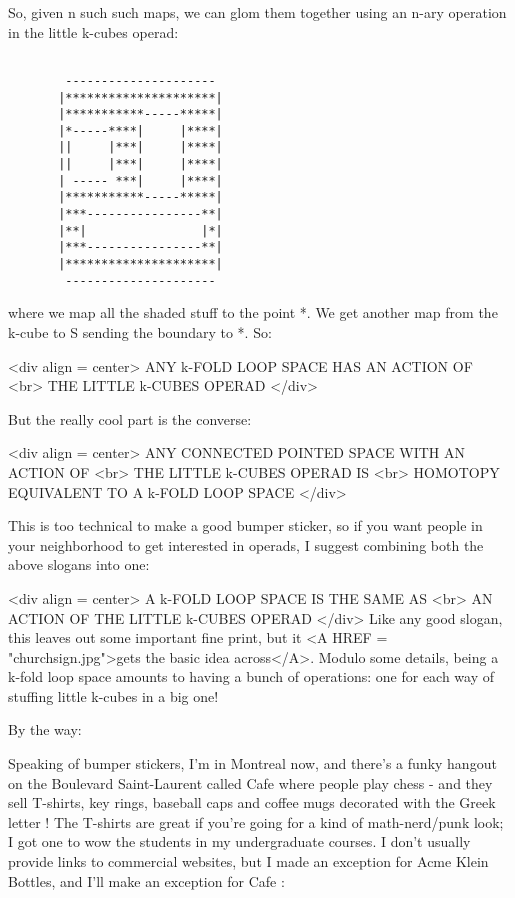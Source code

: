 So, given n such such maps, we can glom them together using an 
n-ary operation in the little k-cubes operad:


\begin{verbatim}

        ---------------------
       |*********************|
       |***********-----*****|
       |*-----****|     |****| 
       ||     |***|     |****|
       ||     |***|     |****|
       | ----- ***|     |****|
       |***********-----*****|
       |***----------------**|
       |**|                |*|
       |***----------------**|
       |*********************|
        ---------------------
\end{verbatim}
    
where we map all the shaded stuff to the point *.  We get 
another map from the k-cube to S sending the boundary to *.
So: 

<div align = center>
             ANY k-FOLD LOOP SPACE HAS AN ACTION OF <br>
                  THE LITTLE k-CUBES OPERAD
</div>

But the really cool part is the converse: 

<div align = center>
           ANY CONNECTED POINTED SPACE WITH AN ACTION OF <br>
                THE LITTLE k-CUBES OPERAD IS  <br>
         HOMOTOPY EQUIVALENT TO A k-FOLD LOOP SPACE
</div>

This is too technical to make a good bumper sticker, so if you 
want people in your neighborhood to get interested in operads, 
I suggest combining both the above slogans into one:

<div align = center>
            A k-FOLD LOOP SPACE IS THE SAME AS <br>
          AN ACTION OF THE LITTLE k-CUBES OPERAD                  
</div>
Like any good slogan, this leaves out some important fine print, 
but it <A HREF = "churchsign.jpg">gets the basic idea across</A>.  
Modulo some details, being a
k-fold loop space amounts to having a bunch of operations: one
for each way of stuffing little k-cubes in a big one!

By the way:

Speaking of bumper stickers, I'm in Montreal now, and there's
a funky hangout on the Boulevard Saint-Laurent called Cafe \pi 
where people play chess - and they sell T-shirts, key rings, 
baseball caps and coffee mugs decorated with the Greek letter \pi !  
The T-shirts are great if you're going for a kind of math-nerd/punk 
look; I got one to wow the students in my undergraduate 
courses.  I don't usually provide links to commercial websites, 
but I made an exception for Acme Klein Bottles, and I'll make an 
exception for Cafe \pi :

